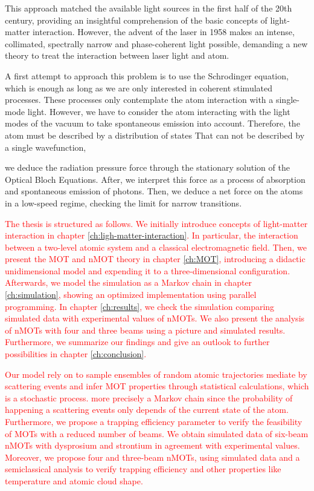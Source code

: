 This approach matched the available light sources in the first half of the 20th century, providing an insightful comprehension of the basic concepts of light-matter interaction. However, the advent of the laser in 1958 makes an intense, collimated, spectrally narrow and phase-coherent light possible, demanding a new theory to treat the interaction between laser light and atom. 

A first attempt to approach this problem is to use the Schrodinger equation, which is enough as long as we are only interested in coherent stimulated processes. These processes only contemplate the atom interaction with a single-mode light. However, we have to consider the atom interacting with the light modes of the vacuum to take spontaneous emission into account. Therefore, the atom must be described by a distribution of states That can not be described by a single wavefunction, 

we deduce the radiation pressure force through the 
stationary solution of the Optical Bloch Equations. After, we interpret this 
force as a process of absorption and spontaneous emission of photons. Then, we 
deduce a net force on the atoms in a low-speed regime, checking the limit for 
narrow transitions.

\textcolor{red}{The thesis is structured as follows. We initially introduce 
concepts of light-matter interaction in chapter 
\ref{ch:ligh-matter-interaction}. In particular, the interaction between a 
two-level atomic system and a classical electromagnetic field. Then, we present 
the MOT and nMOT theory in chapter \ref{ch:MOT}, introducing a didactic 
unidimensional model and expending it to a three-dimensional configuration. 
Afterwards, we model the simulation as a Markov chain in chapter 
\ref{ch:simulation}, showing an optimized implementation using parallel 
programming. In chapter \ref{ch:results}, we check the simulation comparing 
simulated data with experimental values of nMOTs. We also present the analysis 
of nMOTs with four and three beams using a  picture and simulated results. 
Furthermore, we summarize our findings and give an outlook to further 
possibilities in chapter \ref{ch:conclusion}.}

\textcolor{red}{Our model rely on to sample ensembles of random atomic 
trajectories mediate by scattering events and infer MOT properties through 
statistical calculations, which is a stochastic process. more precisely a Markov 
chain since the probability of happening a scattering events only depends of the 
current state of the atom. Furthermore, we propose a trapping efficiency 
parameter to verify the feasibility of MOTs with a reduced number of beams. We 
obtain simulated data of six-beam nMOTs with dysprosium and strontium in 
agreement with experimental values. Moreover, we propose four and three-beam 
nMOTs, using simulated data and a semiclassical analysis to verify trapping 
efficiency and other properties like temperature and atomic cloud shape.}